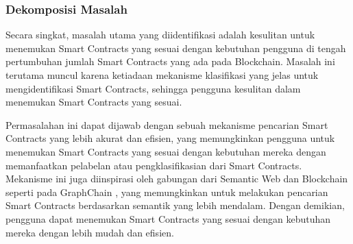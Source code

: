 \subsubsection{Dekomposisi Masalah}
\label{subsubsec:dekomposisi-masalah}


Secara singkat, masalah utama yang diidentifikasi adalah kesulitan untuk menemukan Smart Contracts yang sesuai dengan kebutuhan pengguna di tengah pertumbuhan jumlah Smart Contracts yang ada pada Blockchain. Masalah ini terutama muncul karena ketiadaan mekanisme klasifikasi yang jelas untuk mengidentifikasi Smart Contracts, sehingga pengguna kesulitan dalam menemukan Smart Contracts yang sesuai. 

Permasalahan ini dapat dijawab dengan sebuah mekanisme pencarian Smart Contracts yang lebih akurat dan efisien, yang memungkinkan pengguna untuk menemukan Smart Contracts yang sesuai dengan kebutuhan mereka dengan memanfaatkan pelabelan atau pengklasifikasian dari Smart Contracts. Mekanisme ini juga diinspirasi oleh gabungan dari Semantic Web dan Blockchain seperti pada GraphChain \parencite{sopek2018graphchain}, yang memungkinkan untuk melakukan pencarian Smart Contracts berdasarkan semantik yang lebih mendalam. Dengan demikian, pengguna dapat menemukan Smart Contracts yang sesuai dengan kebutuhan mereka dengan lebih mudah dan efisien.

